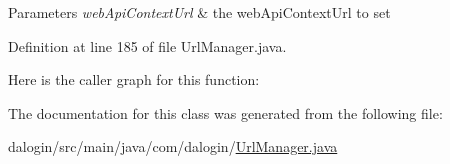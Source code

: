 \begin{DoxyParams}{Parameters}
{\em web\+Api\+Context\+Url} & the web\+Api\+Context\+Url to set \\
\hline
\end{DoxyParams}


Definition at line 185 of file Url\+Manager.\+java.

Here is the caller graph for this function\+:


The documentation for this class was generated from the following file\+:\begin{DoxyCompactItemize}
\item 
dalogin/src/main/java/com/dalogin/\hyperlink{_url_manager_8java}{Url\+Manager.\+java}\end{DoxyCompactItemize}

